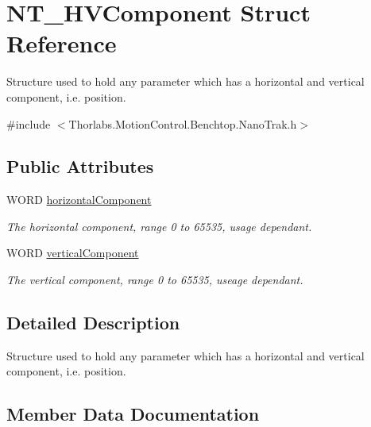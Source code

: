 \hypertarget{struct_n_t___h_v_component}{}\section{N\+T\+\_\+\+H\+V\+Component Struct Reference}
\label{struct_n_t___h_v_component}


Structure used to hold any parameter which has a horizontal and vertical component, i.\+e. position.  




{\ttfamily \#include $<$Thorlabs.\+Motion\+Control.\+Benchtop.\+Nano\+Trak.\+h$>$}

\subsection*{Public Attributes}
\begin{DoxyCompactItemize}
\item 
W\+O\+RD \hyperlink{struct_n_t___h_v_component_a3b64a40a545d587d8c93a1d15ebbafe1}{horizontal\+Component}
\begin{DoxyCompactList}\small\item\em The horizontal component, range 0 to 65535, usage dependant. \end{DoxyCompactList}\item 
W\+O\+RD \hyperlink{struct_n_t___h_v_component_ad99fd0bcf54a5ae6b498b8bee7fe9648}{vertical\+Component}
\begin{DoxyCompactList}\small\item\em The vertical component, range 0 to 65535, useage dependant. \end{DoxyCompactList}\end{DoxyCompactItemize}


\subsection{Detailed Description}
Structure used to hold any parameter which has a horizontal and vertical component, i.\+e. position. 



\subsection{Member Data Documentation}
